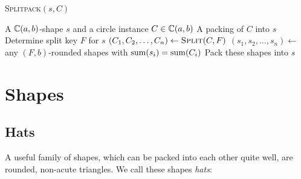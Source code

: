 \documentclass[%
    a4paper,              %
    style=screen,          %
    bibliography=totoc,   %
    nexus,                %
    lnum,                 %
    extramargin,          %
]{tubsbook}
\begin{document}
\begin{algorithm}[htbp!]
    \caption{\textsc{Splitpack}$(s,C)$}
    \begin{algorithmic}
        \Require A $\mathbb{C}(a,b)$-shape $s$ and a circle instance $C \in \mathbb{C}(a,b)$
        \Ensure A packing of $C$ into $s$
        \State Determine split key $F$ for $s$
        \State $(C_1, C_2, \dots, C_n) \gets \textsc{Split}(C,F)$
        \State $(s_1, s_2, \dots, s_n) \gets$ any $(F,b)$-rounded shapes with $\operatorname{sum}(s_i) = \operatorname{sum}(C_i)$
        \State Pack these shapes into $s$
            \State {}
        \EndFor
    \end{algorithmic}
\end{algorithm}

%
%



\chapter{Shapes}

\section{Hats}

A useful family of shapes, which can be packed into each other quite well, are rounded, non-acute triangles. We call these shapes \emph{hats}:
\end{document}
